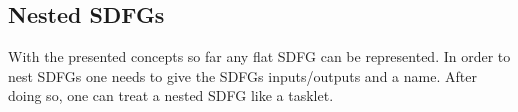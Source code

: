 \subsection{Nested SDFGs}
With the presented concepts so far any flat SDFG can be represented. In order to nest SDFGs one needs to give the SDFGs inputs/outputs and a name. After doing so, one can treat a nested SDFG like a tasklet.
